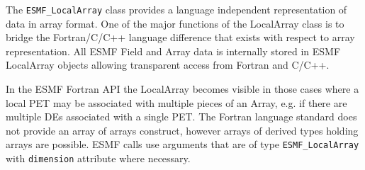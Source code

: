 
The {\tt ESMF\_LocalArray} class provides a language independent representation of data in array format. One of the major functions of the LocalArray class is to bridge the Fortran/C/C++ language difference that exists with respect to array representation. All ESMF Field and Array data is internally stored in ESMF LocalArray objects allowing transparent access from Fortran and C/C++.

In the ESMF Fortran API the LocalArray becomes visible in those cases where a local PET may be associated with multiple pieces of an Array, e.g. if there are multiple DEs associated with a single PET. The Fortran language standard does not provide an array of arrays construct, however arrays of derived types holding arrays are possible. ESMF calls use arguments that are of type {\tt ESMF\_LocalArray} with {\tt dimension} attribute where necessary.

